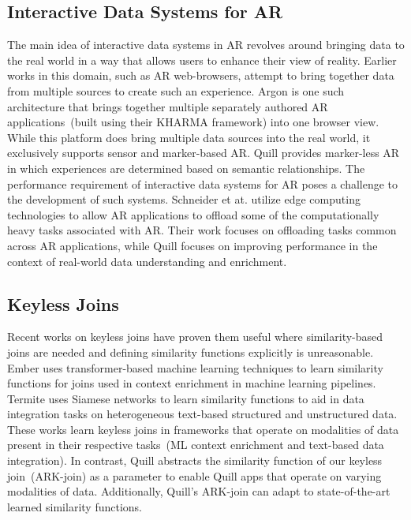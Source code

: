 \documentclass[11pt]{article}
\begin{document}
\subsection{Interactive Data Systems for AR} The main idea of interactive data systems in AR revolves around bringing data to the real world in a way that allows users to enhance their view of reality. Earlier works in this domain, such as AR web-browsers, attempt to bring together data from multiple sources to create such an experience. Argon \cite{macintyre2011argon} is one such architecture that brings together multiple separately authored AR applications~(built using their KHARMA \cite{hill2010kharma} framework) into one browser view.
While this platform does bring multiple data sources into the real world, it exclusively supports sensor and marker-based AR.
Quill provides marker-less AR in which experiences are determined based on semantic relationships.
The performance requirement of interactive data systems for AR poses a challenge to the development of such systems. Schneider et at. \cite{schneider2017augmented} utilize edge computing technologies to allow AR applications to offload some of the computationally heavy tasks associated with AR. Their work focuses on offloading tasks common across AR applications, while Quill focuses on improving performance in the context of real-world data understanding and enrichment.

\subsection{Keyless Joins} Recent works on keyless joins have proven them useful where similarity-based joins are needed and defining similarity functions explicitly is unreasonable.
Ember \cite{suri2021ember} uses transformer-based machine learning techniques to learn similarity functions for joins used in context enrichment in machine learning pipelines.
Termite \cite{fernandez2019termite} uses Siamese networks to learn similarity functions to aid in data integration tasks on heterogeneous text-based structured and unstructured data.
These works learn keyless joins in frameworks that operate on modalities of data present in their respective tasks~(ML context enrichment and text-based data integration).
In contrast, Quill abstracts the similarity function of our keyless join~(ARK-join) as a parameter to enable Quill apps that operate on varying modalities of data.
Additionally, Quill's ARK-join can adapt to state-of-the-art learned similarity functions.
\end{document}
